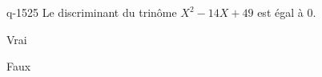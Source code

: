\begin{truefalse}{q-1525}
Le discriminant du trinôme $X^2-14X+49$ est égal à $0$.
\item* Vrai
\item Faux
\end{truefalse}

